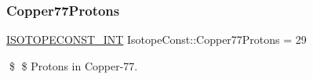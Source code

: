 \subsubsection{\texorpdfstring{Copper77\+Protons}{Copper77Protons}}
{\footnotesize\ttfamily \mbox{\hyperlink{group___isotope_const-_macros_ga5f18360b3e99483a35c32d789e62621c}{I\+S\+O\+T\+O\+P\+E\+C\+O\+N\+S\+T\+\_\+\+I\+NT}} Isotope\+Const\+::\+Copper77\+Protons = 29}

\$ \$ Protons in Copper-\/77. 